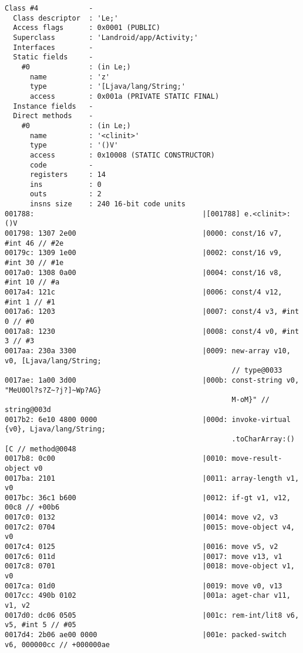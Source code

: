 \begin{lstlisting}
Class #4            -
  Class descriptor  : 'Le;'
  Access flags      : 0x0001 (PUBLIC)
  Superclass        : 'Landroid/app/Activity;'
  Interfaces        -
  Static fields     -
    #0              : (in Le;)
      name          : 'z'
      type          : '[Ljava/lang/String;'
      access        : 0x001a (PRIVATE STATIC FINAL)
  Instance fields   -
  Direct methods    -
    #0              : (in Le;)
      name          : '<clinit>'
      type          : '()V'
      access        : 0x10008 (STATIC CONSTRUCTOR)
      code          -
      registers     : 14
      ins           : 0
      outs          : 2
      insns size    : 240 16-bit code units
001788:                                        |[001788] e.<clinit>:()V
001798: 1307 2e00                              |0000: const/16 v7, #int 46 // #2e
00179c: 1309 1e00                              |0002: const/16 v9, #int 30 // #1e
0017a0: 1308 0a00                              |0004: const/16 v8, #int 10 // #a
0017a4: 121c                                   |0006: const/4 v12, #int 1 // #1
0017a6: 1203                                   |0007: const/4 v3, #int 0 // #0
0017a8: 1230                                   |0008: const/4 v0, #int 3 // #3
0017aa: 230a 3300                              |0009: new-array v10, v0, [Ljava/lang/String;
                                                      // type@0033
0017ae: 1a00 3d00                              |000b: const-string v0, "MeU0Ol?s?Z~?j?]~Wp?AG}
                                                      M-oM}" // string@003d
0017b2: 6e10 4800 0000                         |000d: invoke-virtual {v0}, Ljava/lang/String;
                                                      .toCharArray:()[C // method@0048
0017b8: 0c00                                   |0010: move-result-object v0
0017ba: 2101                                   |0011: array-length v1, v0
0017bc: 36c1 b600                              |0012: if-gt v1, v12, 00c8 // +00b6
0017c0: 0132                                   |0014: move v2, v3
0017c2: 0704                                   |0015: move-object v4, v0
0017c4: 0125                                   |0016: move v5, v2
0017c6: 011d                                   |0017: move v13, v1
0017c8: 0701                                   |0018: move-object v1, v0
0017ca: 01d0                                   |0019: move v0, v13
0017cc: 490b 0102                              |001a: aget-char v11, v1, v2
0017d0: dc06 0505                              |001c: rem-int/lit8 v6, v5, #int 5 // #05
0017d4: 2b06 ae00 0000                         |001e: packed-switch v6, 000000cc // +000000ae

\end{lstlisting}
